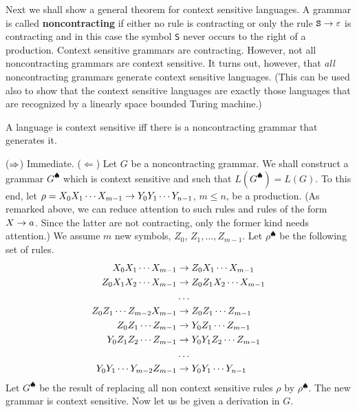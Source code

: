 Next we shall show a general theorem for context sensitive languages.
A grammar is called \textbf{noncontracting} if either no rule is
contracting or only the rule $\mbox{\tt S} \rightarrow \varepsilon$ is contracting
and in this case the symbol {\tt S} never occurs to the right of a
production. Context sensitive grammars are contracting. However, 
not all noncontracting grammars are context sensitive. It turns out, 
however, that {\it all\/} noncontracting grammars generate context 
sensitive languages. (This can be used also to show that the context 
sensitive languages are exactly those languages that are recognized 
by a linearly space bounded Turing machine.)
\begin{thm}
\label{thm:noncontracting}
A language is context sensitive iff there is a noncontracting
grammar that generates it.
\end{thm}
\proofbeg
($\Rightarrow$) Immediate. ($\Leftarrow$) Let $G$ be a noncontracting grammar. 
We shall construct a grammar $G^{\spadesuit}$ which is context sensitive 
and such that $L(G^{\spadesuit}) = L(G)$. To this end, let
$\rho = X_0 X_1 \dotsb X_{m-1} \rightarrow Y_0 Y_1 \dotsb Y_{n-1}$, $m \leq n$, 
be a production. (As remarked above, we can reduce
attention to such rules and rules of the form $X \rightarrow a$. Since the
latter are not contracting, only the former kind needs attention.)
We assume $m$ new symbols, $Z_0$, $Z_1, \dotsc, Z_{m-1}$. Let 
$\rho^{\spadesuit}$ be the following set of rules. 
\begin{equation}
\begin{split}
X_0 X_1 \dotsb X_{m-1} & \rightarrow Z_0 X_1 \dotsb X_{m-1} \\
Z_0 X_1 X_2 \dotsb X_{m-1} & \rightarrow Z_0 Z_1 X_2 \dotsb X_{m-1} \\
     & \dotso \\
Z_0 Z_1 \dotsb Z_{m-2} X_{m-1} & \rightarrow Z_0 Z_1 \dotsb Z_{m-1} \\
Z_0 Z_1 \dotsb Z_{m-1} & \rightarrow Y_0 Z_1 \dotsb Z_{m-1} \\
Y_0 Z_1 Z_2 \dotsb Z_{m-1} & \rightarrow Y_0 Y_1 Z_2 \dotsb Z_{m-1} \\
     & \dotso \\
Y_0 Y_1 \dotsb Y_{m-2} Z_{m-1} & \rightarrow Y_0 Y_1 \dotsb Y_{n-1}
\end{split}
\end{equation}
Let $G^{\spadesuit}$ be the result of replacing all non context 
sensitive rules $\rho$ by $\rho^{\spadesuit}$. The new grammar is
context sensitive. Now let us be given a derivation in $G$.

